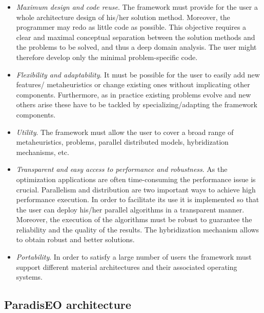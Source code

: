 \begin{itemize}
\item {\em Maximum design and code reuse\/}. The framework must provide for the user a whole architecture design of his/her solution method. Moreover, the programmer may redo as little code as possible. This objective requires a clear and maximal conceptual separation between the solution methods and the problems to be solved, and thus a deep domain analysis. The user might therefore develop only the minimal problem-specific code.

\item {\em Flexibility and adaptability\/}. It must be possible for the user to easily add new features/ metaheuristics or change existing ones without implicating other components. Furthermore, as in practice existing problems evolve and new others arise these have to be tackled by specializing/adapting the framework components.

\item {\em Utility\/}. The framework must allow the user to cover a broad range of metaheuristics, problems, parallel distributed models, hybridization mechanisms, etc.

\item {\em Transparent and easy access to performance and robustness\/}. As the optimization applications are often time-consuming the performance issue is crucial. Parallelism and distribution are two important ways to achieve high performance execution. In order to facilitate its use it is implemented so that the user can deploy his/her parallel algorithms in a transparent manner. Moreover, the execution of the algorithms must be robust to guarantee the reliability and the quality of the results. The hybridization mechanism allows to obtain robust and better solutions.

\item {\em Portability\/}. In order to satisfy a large number of users the framework must support different material architectures and their associated operating systems. \end{itemize}
\hypertarget{main_architecture}{}\subsection{Paradis\-EO architecture}\label{main_architecture}
